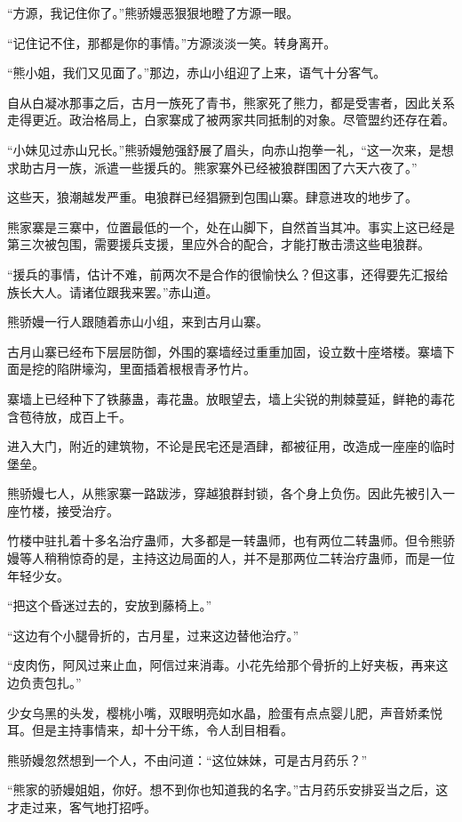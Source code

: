 \begin{this_body}
“方源，我记住你了。”熊骄嫚恶狠狠地瞪了方源一眼。

“记住记不住，那都是你的事情。”方源淡淡一笑。转身离开。

“熊小姐，我们又见面了。”那边，赤山小组迎了上来，语气十分客气。

自从白凝冰那事之后，古月一族死了青书，熊家死了熊力，都是受害者，因此关系走得更近。政治格局上，白家寨成了被两家共同抵制的对象。尽管盟约还存在着。

“小妹见过赤山兄长。”熊骄嫚勉强舒展了眉头，向赤山抱拳一礼，“这一次来，是想求助古月一族，派遣一些援兵的。熊家寨外已经被狼群围困了六天六夜了。”

这些天，狼潮越发严重。电狼群已经猖獗到包围山寨。肆意进攻的地步了。

熊家寨是三寨中，位置最低的一个，处在山脚下，自然首当其冲。事实上这已经是第三次被包围，需要援兵支援，里应外合的配合，才能打散击溃这些电狼群。

“援兵的事情，估计不难，前两次不是合作的很愉快么？但这事，还得要先汇报给族长大人。请诸位跟我来罢。”赤山道。

熊骄嫚一行人跟随着赤山小组，来到古月山寨。

古月山寨已经布下层层防御，外围的寨墙经过重重加固，设立数十座塔楼。寨墙下面是挖的陷阱壕沟，里面插着根根青矛竹片。

寨墙上已经种下了铁藤蛊，毒花蛊。放眼望去，墙上尖锐的荆棘蔓延，鲜艳的毒花含苞待放，成百上千。

进入大门，附近的建筑物，不论是民宅还是酒肆，都被征用，改造成一座座的临时堡垒。

熊骄嫚七人，从熊家寨一路跋涉，穿越狼群封锁，各个身上负伤。因此先被引入一座竹楼，接受治疗。

竹楼中驻扎着十多名治疗蛊师，大多都是一转蛊师，也有两位二转蛊师。但令熊骄嫚等人稍稍惊奇的是，主持这边局面的人，并不是那两位二转治疗蛊师，而是一位年轻少女。

“把这个昏迷过去的，安放到藤椅上。”

“这边有个小腿骨折的，古月星，过来这边替他治疗。”

“皮肉伤，阿风过来止血，阿信过来消毒。小花先给那个骨折的上好夹板，再来这边负责包扎。”

少女乌黑的头发，樱桃小嘴，双眼明亮如水晶，脸蛋有点点婴儿肥，声音娇柔悦耳。但是主持事情来，却十分干练，令人刮目相看。

熊骄嫚忽然想到一个人，不由问道：“这位妹妹，可是古月药乐？”

“熊家的骄嫚姐姐，你好。想不到你也知道我的名字。”古月药乐安排妥当之后，这才走过来，客气地打招呼。


\end{this_body}
